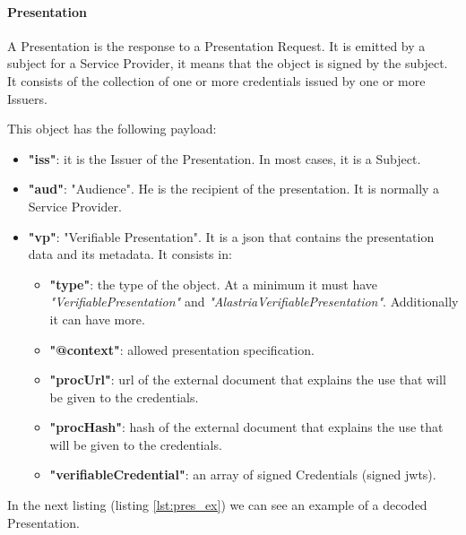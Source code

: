 \documentclass[a4paper, 12pt]{article} %
\begin{document}
            \paragraph{Presentation}
                A Presentation is the response to a Presentation Request. It is emitted by a subject for a Service Provider, it means that the object is signed by the subject. It consists of the collection of one or more credentials issued by one or more Issuers.
                
                This object has the following payload:
                \begin{itemize}
                    \item \textbf{"iss"}: it is the Issuer of the Presentation. In most cases, it is a Subject.
                    \item \textbf{"aud"}: "Audience". He is the recipient of the presentation. It is normally a Service Provider.
                    \item \textbf{"vp"}: "Verifiable Presentation". It is a \acrshort{json} that contains the presentation data and its metadata. It consists in:
                    \begin{itemize}
                        \item \textbf{"type"}: the type of the object. At a minimum it must have \textit{"VerifiablePresentation"} and \textit{"AlastriaVerifiablePresentation"}. Additionally it can have more.
                        \item \textbf{"@context"}: allowed presentation specification.
                        \item \textbf{"procUrl"}: \acrshort{url} of the external document that explains the use that will be given to the credentials.
                        \item \textbf{"procHash"}: hash of the external document that explains the use that will be given to the credentials.
                        \item \textbf{"verifiableCredential"}: an array of signed Credentials (signed \acrshort{jwt}s).
                    \end{itemize}
                \end{itemize}
                In the next listing (listing \ref{lst:pres_ex}) we can see an example of a decoded Presentation.\\
                
            
\end{document}
